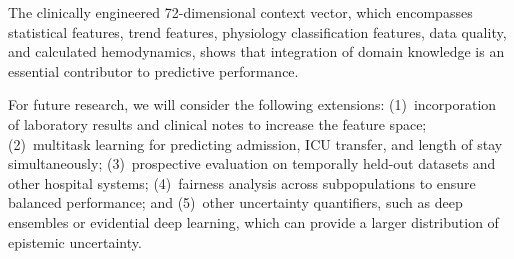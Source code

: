 \documentclass[runningheads]{llncs}
\begin{document}
The clinically engineered 72-dimensional context vector, which encompasses statistical features, trend features, physiology classification features, data quality, and calculated hemodynamics, shows that integration of domain knowledge is an essential contributor to predictive performance.

For future research, we will consider the following extensions: (1)~incorporation of laboratory results and clinical notes to increase the feature space; (2)~multitask learning for predicting admission, ICU transfer, and length of stay simultaneously; (3)~prospective evaluation on temporally held-out datasets and other hospital systems; (4)~fairness analysis across subpopulations to ensure balanced performance; and (5)~other uncertainty quantifiers, such as deep ensembles or evidential deep learning, which can provide a larger distribution of epistemic uncertainty.
\end{document}
